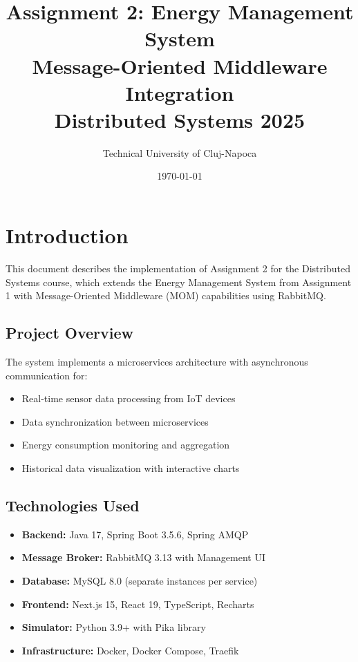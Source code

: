 \documentclass[12pt,a4paper]{article}
\title{\textbf{Assignment 2: Energy Management System}\\
\large Message-Oriented Middleware Integration\\
Distributed Systems 2025}
\author{Technical University of Cluj-Napoca}
\date{\today}
\begin{document}
\maketitle
\tableofcontents
\newpage


\section{Introduction}

This document describes the implementation of Assignment 2 for the Distributed Systems course, which extends the Energy Management System from Assignment 1 with Message-Oriented Middleware (MOM) capabilities using RabbitMQ.

\subsection{Project Overview}

The system implements a microservices architecture with asynchronous communication for:
\begin{itemize}
    \item Real-time sensor data processing from IoT devices
    \item Data synchronization between microservices
    \item Energy consumption monitoring and aggregation
    \item Historical data visualization with interactive charts
\end{itemize}

\subsection{Technologies Used}

\begin{itemize}
    \item \textbf{Backend:} Java 17, Spring Boot 3.5.6, Spring AMQP
    \item \textbf{Message Broker:} RabbitMQ 3.13 with Management UI
    \item \textbf{Database:} MySQL 8.0 (separate instances per service)
    \item \textbf{Frontend:} Next.js 15, React 19, TypeScript, Recharts
    \item \textbf{Simulator:} Python 3.9+ with Pika library
    \item \textbf{Infrastructure:} Docker, Docker Compose, Traefik
\end{itemize}
\end{document}
